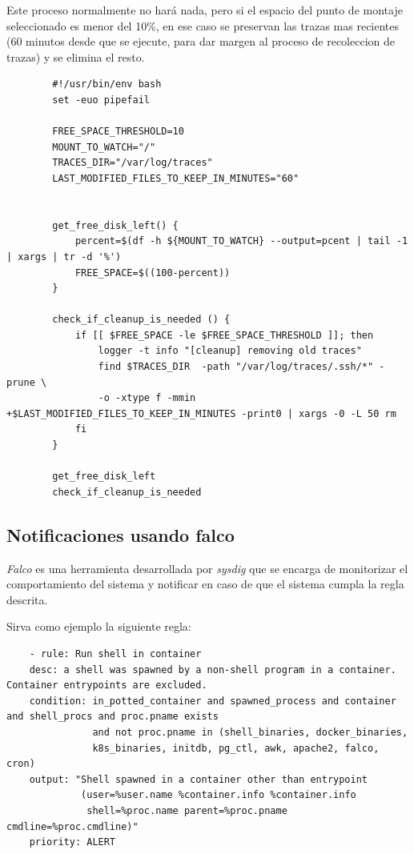 Este proceso normalmente no hará nada, pero si el espacio del punto de montaje seleccionado es menor del 10\%, en ese caso
se preservan las trazas mas recientes (60 minutos desde que se ejecute, para dar margen al proceso de recoleccion de trazas) y se elimina el resto.

    \begin{verbatim}
        #!/usr/bin/env bash
        set -euo pipefail
        
        FREE_SPACE_THRESHOLD=10
        MOUNT_TO_WATCH="/"
        TRACES_DIR="/var/log/traces"
        LAST_MODIFIED_FILES_TO_KEEP_IN_MINUTES="60"
        
        
        get_free_disk_left() {
            percent=$(df -h ${MOUNT_TO_WATCH} --output=pcent | tail -1 | xargs | tr -d '%')
            FREE_SPACE=$((100-percent))
        }
        
        check_if_cleanup_is_needed () {
            if [[ $FREE_SPACE -le $FREE_SPACE_THRESHOLD ]]; then
                logger -t info "[cleanup] removing old traces"
                find $TRACES_DIR  -path "/var/log/traces/.ssh/*" -prune \
                -o -xtype f -mmin +$LAST_MODIFIED_FILES_TO_KEEP_IN_MINUTES -print0 | xargs -0 -L 50 rm
            fi
        }
        
        get_free_disk_left
        check_if_cleanup_is_needed
    \end{verbatim}
    

\subsection{Notificaciones usando falco}

\emph{Falco} es una herramienta desarrollada por \emph{sysdig} que se encarga de monitorizar el comportamiento del sistema y notificar en 
caso de que el sistema cumpla la regla descrita.

Sirva como ejemplo la siguiente regla:

\begin{verbatim}
    - rule: Run shell in container
    desc: a shell was spawned by a non-shell program in a container. Container entrypoints are excluded.
    condition: in_potted_container and spawned_process and container and shell_procs and proc.pname exists 
               and not proc.pname in (shell_binaries, docker_binaries, 
               k8s_binaries, initdb, pg_ctl, awk, apache2, falco, cron)
    output: "Shell spawned in a container other than entrypoint 
             (user=%user.name %container.info %container.info 
              shell=%proc.name parent=%proc.pname cmdline=%proc.cmdline)"
    priority: ALERT
\end{verbatim}
\bigskip

